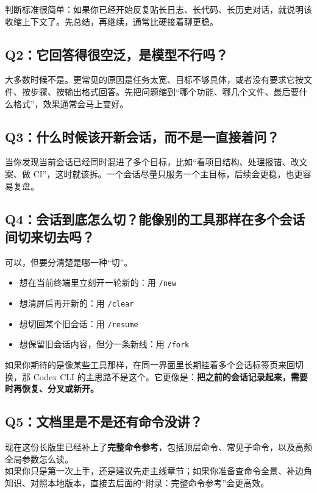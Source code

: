 \documentclass[UTF8,a4paper,12pt]{ctexart}
\begin{document}
\begin{tipbox}
判断标准很简单：如果你已经开始反复贴长日志、长代码、长历史对话，就说明该收缩上下文了。先总结，再继续，通常比硬接着聊更稳。
\end{tipbox}

\subsection{Q2：它回答得很空泛，是模型不行吗？}

大多数时候不是。更常见的原因是任务太宽、目标不够具体，或者没有要求它按文件、按步骤、按输出格式回答。先把问题缩到“哪个功能、哪几个文件、最后要什么格式”，效果通常会马上变好。

\subsection{Q3：什么时候该开新会话，而不是一直接着问？}

当你发现当前会话已经同时混进了多个目标，比如“看项目结构、处理报错、改文案、做 CI”，这时就该拆。一个会话尽量只服务一个主目标，后续会更稳，也更容易复盘。

\subsection{Q4：会话到底怎么切？能像别的工具那样在多个会话间切来切去吗？}

可以，但要分清楚是哪一种“切”。

\begin{itemize}
  \item 想在当前终端里立刻开一轮新的：用 \texttt{/new}
  \item 想清屏后再开新的：用 \texttt{/clear}
  \item 想切回某个旧会话：用 \texttt{/resume}
  \item 想保留旧会话内容，但分一条新线：用 \texttt{/fork}
\end{itemize}

如果你期待的是像某些工具那样，在同一界面里长期挂着多个会话标签页来回切换，那 Codex CLI 的主思路不是这个。它更像是：\textbf{把之前的会话记录起来，需要时再恢复、分叉或新开。}

\subsection{Q5：文档里是不是还有命令没讲？}

现在这份长版里已经补上了\textbf{完整命令参考}，包括顶层命令、常见子命令，以及高频全局参数怎么读。\\
如果你只是第一次上手，还是建议先走主线章节；如果你准备查命令全景、补边角知识、对照本地版本，直接去后面的“附录：完整命令参考”会更高效。
\end{document}
